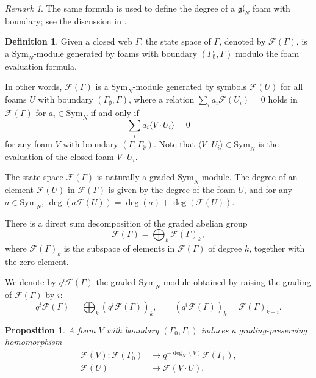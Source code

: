 \documentclass[12pt]{amsart}
\newtheorem{proposition}[theorem]{Proposition}
\theoremstyle{definition}
\newtheorem{definition}[theorem]{Definition}
\theoremstyle{remark}
\newtheorem{remark}[theorem]{Remark}
\numberwithin{equation}{section}
\numberwithin{figure}{section}
\newcommand{\GL}{\mathfrak{gl}}
\newcommand{\emptyweb}{\Gamma_{\emptyset}}
\newcommand{\Symf}{\mathrm{Sym}_N}
\newcommand{\foamdeg}{\deg_N}
\begin{document}
\begin{remark}
The same formula is used to define the degree of a $\GL_N$ foam with
boundary; see the discussion in \cite[Section 4]{RW2020}.
\end{remark}

\begin{definition}\label{def:foam between closed webs}
Given a closed web $\Gamma$, the state space of $\Gamma$, denoted by
$\mathcal{F}(\Gamma)$, is a $\Symf$-module generated by foams with boundary
$(\emptyweb,\Gamma)$ modulo the foam evaluation formula.

In other words, $\mathcal{F}(\Gamma)$ is a $\Symf$-module generated by
symbols $\mathcal{F}(U)$ for all foams $U$ with boundary
$(\emptyweb,\Gamma)$, where a relation
$\sum_i a_i\mathcal{F}(U_i)=0$ holds in $\mathcal{F}(\Gamma)$ for
$a_i\in\Symf$ if and only if
\[
\sum_i a_i\langle V\cdot U_i\rangle=0
\]
for any foam $V$ with boundary $(\Gamma,\emptyweb)$. Note that
$\langle V\cdot U_i\rangle\in\Symf$ is the evaluation of the closed foam
$V\cdot U_i$.

The state space $\mathcal{F}(\Gamma)$ is naturally a graded $\Symf$-module.
The degree of an element $\mathcal{F}(U)$ in $\mathcal{F}(\Gamma)$ is given
by the degree of the foam $U$, and for any $a \in\Symf$, 
$\deg(a\mathcal{F}(U))=\deg(a)+\deg(\mathcal{F}(U))$.

There is a direct sum decomposition of the graded abelian group
\[
\mathcal{F}(\Gamma)=\bigoplus_k\mathcal{F}(\Gamma)_k,
\]
where $\mathcal{F}(\Gamma)_k$ is the subspace of elements in
$\mathcal{F}(\Gamma)$ of degree $k$, together with the zero element.

We denote by $q^i\mathcal{F}(\Gamma)$ the graded $\Symf$-module obtained by
raising the grading of $\mathcal{F}(\Gamma)$ by $i$:
\[
q^i\mathcal{F}(\Gamma)=\bigoplus_k(q^i\mathcal{F}(\Gamma))_k,
\qquad
(q^i\mathcal{F}(\Gamma))_k=\mathcal{F}(\Gamma)_{k-i}.
\]
\end{definition}

\begin{proposition}
A foam $V$ with boundary $(\Gamma_0,\Gamma_1)$ induces a
grading-preserving homomorphism
\begin{align*}
\mathcal{F}(V):\mathcal{F}(\Gamma_0)
  &\longrightarrow q^{-\foamdeg(V)}\mathcal{F}(\Gamma_1),\\
\mathcal{F}(U)&\longmapsto\mathcal{F}(V\cdot U).
\end{align*}
\end{proposition}
\end{document}
